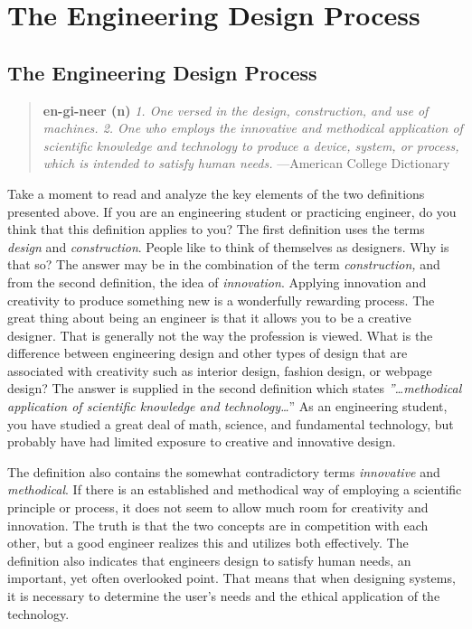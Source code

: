 
\chapter{The Engineering Design Process}
\section{The Engineering Design Process}
\graphicspath{ {./chapter01/Fig} }

\begin{quote}
\textbf{en-gi-neer (n)} 
\textit{1. One versed in the design, construction, and
use of machines. 2. One who employs the innovative and methodical
application of scientific knowledge and technology to produce a device,
system, or process, which is intended to satisfy human needs.} ---American College Dictionary
\end{quote}

Take a moment to read and analyze the key elements of the two
definitions presented above. If you are an engineering student or
practicing engineer, do you think that this definition applies to you?
The first definition uses the terms \emph{design} and
\emph{construction}. People like to think of themselves as designers.
Why is that so? The answer may be in the combination of the term
\emph{construction,} and from the second definition, the idea of
\emph{innovation}. Applying innovation and creativity to produce
something new is a wonderfully rewarding process. The great thing about
being an engineer is that it allows you to be a creative designer. That
is generally not the way the profession is viewed. What is the
difference between engineering design and other types of design that are
associated with creativity such as interior design, fashion design, or
webpage design? The answer is supplied in the second definition which
states \emph{''\ldots methodical application of scientific knowledge and
technology\ldots{}}'' As an engineering student, you have studied a
great deal of math, science, and fundamental technology, but probably
have had limited exposure to creative and innovative design.

The definition also contains the somewhat contradictory terms
\emph{innovative} and \emph{methodical}. If there is an established and
methodical way of employing a scientific principle or process, it does
not seem to allow much room for creativity and innovation. The truth is
that the two concepts are in competition with each other, but a good
engineer realizes this and utilizes both effectively. The definition
also indicates that engineers design to satisfy human needs, an
important, yet often overlooked point. That means that when designing
systems, it is necessary to determine the user's needs and the ethical
application of the technology.

